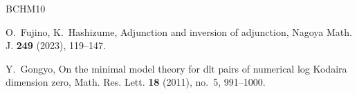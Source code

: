 \documentclass[12pt]{amsart}
\theoremstyle{definition}
\begin{document}
\begin{thebibliography}{BCHM10}



O.~Fujino, K.~Hashizume, Adjunction and inversion of adjunction, Nagoya Math. J. {\textbf{249}} (2023), 119--147. 









Y.~Gongyo, On the minimal model theory for dlt pairs of numerical log Kodaira dimension zero, Math. Res. Lett. {\textbf{18}} (2011), no.~5, 991--1000.






\end{thebibliography}
\end{document}

